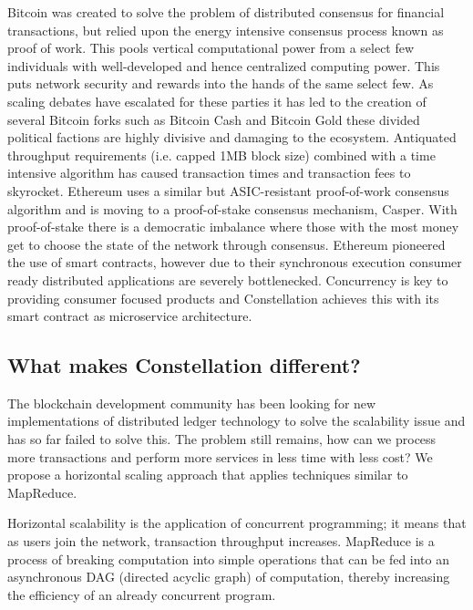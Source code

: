 \documentclass{article}
\begin{document}
Bitcoin was created to solve the problem of distributed consensus for financial transactions, but relied upon the energy intensive consensus process known as proof of work. This pools vertical computational power from a select few individuals with well-developed and hence centralized computing power. This puts network security and rewards into the hands of the same select few. As scaling debates have escalated for these parties it has led to the creation of several Bitcoin forks such as Bitcoin Cash and Bitcoin Gold these divided political factions are highly divisive and damaging to the ecosystem. Antiquated throughput requirements (i.e. capped 1MB block size) combined with a time intensive algorithm has caused transaction times and transaction fees to skyrocket. Ethereum uses a similar but ASIC-resistant proof-of-work consensus algorithm  and is  moving to  a  proof-of-stake consensus mechanism, Casper.  With proof-of-stake there is a democratic imbalance where those with the most money get to choose the state of the network through consensus. Ethereum pioneered the use of smart contracts, however due to their synchronous execution consumer ready distributed applications are severely bottlenecked. Concurrency is key to providing consumer focused products and Constellation achieves this with its smart contract as microservice architecture.

\subsection{What makes Constellation different?}
The blockchain development community has been looking for new implementations of distributed ledger technology to solve the scalability issue and has so far failed to solve this. The problem still remains, how can we process more transactions and perform more services in less time with less cost? We propose a horizontal scaling approach that applies techniques similar to MapReduce.  

Horizontal scalability is the application of concurrent programming; it means that as users join the network, transaction throughput increases. MapReduce is a process of breaking computation into simple operations that can be fed into an asynchronous DAG (directed acyclic graph) of computation, thereby increasing the efficiency of an already concurrent program. 
\end{document}
